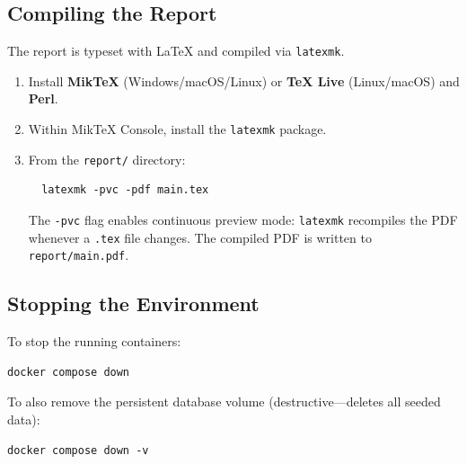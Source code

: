 \subsection{Compiling the Report}

The report is typeset with \LaTeX{} and compiled via \texttt{latexmk}.

\begin{enumerate}
  \item Install \textbf{MikTeX} (Windows/macOS/Linux) or \textbf{TeX Live} (Linux/macOS) and \textbf{Perl}.
  \item Within MikTeX Console, install the \texttt{latexmk} package.
  \item From the \texttt{report/} directory:
  \begin{verbatim}
  latexmk -pvc -pdf main.tex
  \end{verbatim}
  The \texttt{-pvc} flag enables continuous preview mode: \texttt{latexmk} recompiles the PDF whenever a \texttt{.tex} file changes. The compiled PDF is written to \texttt{report/main.pdf}.
\end{enumerate}

\subsection{Stopping the Environment}

To stop the running containers:

\begin{verbatim}
docker compose down
\end{verbatim}

To also remove the persistent database volume (destructive---deletes all seeded data):

\begin{verbatim}
docker compose down -v
\end{verbatim}
